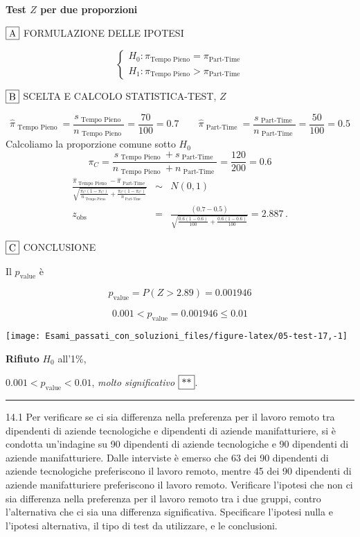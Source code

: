 \documentclass[
  11pt,
]{book}
\theoremstyle{mytheoremstyle}
\theoremstyle{mydefstyle}
\newenvironment{sol}
  {
  \begin{tcolorbox}[enhanced,breakable,arc=0.1mm,boxrule=1pt,colback=white,colframe=iblue,
  title=\bf \fontfamily{lmss}\selectfont \hspace{.5 cm} Soluzione,drop fuzzy shadow]

}{
\end{tcolorbox}
  }
\begin{document}
\begin{sol}
\textbf{Test \(Z\) per due proporzioni}

\(\fbox{A}\) FORMULAZIONE DELLE IPOTESI

\[\begin{cases}
   H_0: \pi_\text{Tempo Pieno} = \pi_\text{Part-Time} \\
   H_1: \pi_\text{Tempo Pieno} > \pi_\text{Part-Time} 
   \end{cases}\]

\(\fbox{B}\) SCELTA E CALCOLO STATISTICA-TEST, \(Z\)

\[\hat\pi_\text{ Tempo Pieno }=\frac{s_\text{ Tempo Pieno }}{n_\text{ Tempo Pieno }}=\frac{ 70 }{ 100 }= 0.7 \qquad
   \hat\pi_\text{ Part-Time }=\frac{s_\text{ Part-Time }}{n_\text{ Part-Time }}=\frac{ 50 }{ 100 }= 0.5 \]Calcoliamo la proporzione comune sotto \(H_0\)
\[
     \pi_C=\frac{s_\text{ Tempo Pieno }+s_\text{ Part-Time }}{n_\text{ Tempo Pieno }+n_\text{ Part-Time }}=
     \frac{ 120 }{ 200 }= 0.6 
   \]\begin{eqnarray*}
   \frac{\hat\pi_\text{ Tempo Pieno } - \hat\pi_\text{ Part-Time }}
   {\sqrt{\frac {\pi_C(1-\pi_C)}{n_\text{ Tempo Pieno }}+\frac {\pi_C(1-\pi_C)}{n_\text{ Part-Time }}}}&\sim&N(0,1)\\
   z_{\text{obs}}
   &=& \frac{ ( 0.7 -  0.5 )} {\sqrt{\frac{ 0.6 (1- 0.6 )}{ 100 }+\frac{ 0.6 (1- 0.6 )}{ 100 }}}
   =   2.887 \, .
   \end{eqnarray*}

\(\fbox{C}\) CONCLUSIONE

Il \(p_{\text{value}}\) è

\[ p_{\text{value}} = P(Z>2.89)=0.001946 \]

\[
 0.001 < p_\text{value}= 0.001946 \leq 0.01 
\]

\begin{center}\texttt{[image: Esami\_passati\_con\_soluzioni\_files/figure-latex/05-test-17,-1]} \end{center}

\textbf{Rifiuto} \(H_0\) all'1\%,

\(0.001<p_\text{value}<0.01\), \emph{molto significativo} \(\fbox{**}\).

\end{sol}

\begin{center}\rule{0.5\linewidth}{0.5pt}\end{center}

14.1 Per verificare se ci sia differenza nella preferenza per il lavoro remoto tra dipendenti di aziende tecnologiche e dipendenti di aziende manifatturiere, si è condotta un'indagine su 90 dipendenti di aziende tecnologiche e 90 dipendenti di aziende manifatturiere. Dalle interviste è emerso che 63 dei 90 dipendenti di aziende tecnologiche preferiscono il lavoro remoto, mentre 45 dei 90 dipendenti di aziende manifatturiere preferiscono il lavoro remoto. Verificare l'ipotesi che non ci sia differenza nella preferenza per il lavoro remoto tra i due gruppi, contro l'alternativa che ci sia una differenza significativa. Specificare l'ipotesi nulla e l'ipotesi alternativa, il tipo di test da utilizzare, e le conclusioni.
\end{document}
